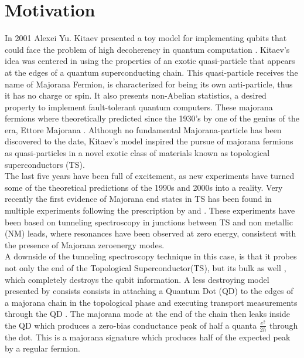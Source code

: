  \chapter{Motivation}





In 2001 Alexei Yu. Kitaev presented a toy model for implementing qubits
that could face the problem of high decoherency in quantum computation \citep{kitaev_unpaired_2001}. Kitaev's idea was centered in using the properties of an exotic quasi-particle that appears at the edges of a quantum superconducting chain. This quasi-particle receives the name of Majorana Fermion, is characterized for being its own anti-particle, thus it has no charge or spin. It also presents non-Abelian statistics, a desired property to implement fault-tolerant quantum computers\citep{kitaev_fault-tolerant_2003}. These majorana fermions where theoretically predicted since the 1930's by one of the genius of the era, Ettore Majorana \citep{wilczek_majorana_2009}.
Although no fundamental Majorana-particle has been discovered to the
date, Kitaev's model inspired the pursue of majorana fermions as
quasi-particles in a novel exotic class of materials known as topological
superconductors (TS)\citep{fu_superconducting_2008,sato_non-abelian_2009,alicea_new_2012}.
\\

The last five years have been full of excitement, as new experiments
have turned some of the theoretical predictions of the 1990s and 2000s
into a reality. Very recently the first evidence of Majorana end states
in TS has been found in multiple experiments \citep{mourik_signatures_2012,das_zero-bias_2012,deng_anomalous_2012}
following the prescription by \citet{oreg_helical_2010} and \citet{lutchyn_majorana_2010}.
These experiments have been based on tunneling spectroscopy in junctions
between TS and non metallic (NM) leads, where resonances have been
observed at zero energy, consistent with the presence of Majorana
zero\textendash energy modes.\\

A downside of the tunneling spectroscopy technique in this case, is
that it probes not only the end of the Topological Superconductor(TS), but its bulk as well ,
which completely destroys the qubit information. A less destroying
model presented by \citet{liu_detecting_2011} consists consists in attaching a Quantum Dot (QD) to the edges of a majorana chain in the topological phase and executing transport measurements through the QD \cite{liu_detecting_2011} . The majorana mode at the end of the chain then leaks inside the QD \cite{vernek_subtle_2014} which produces a zero-bias conductance peak of half a quanta $\frac{e^{2}}{2h}$ through the dot. This is a majorana signature which produces half of the expected peak by a regular fermion.\\


